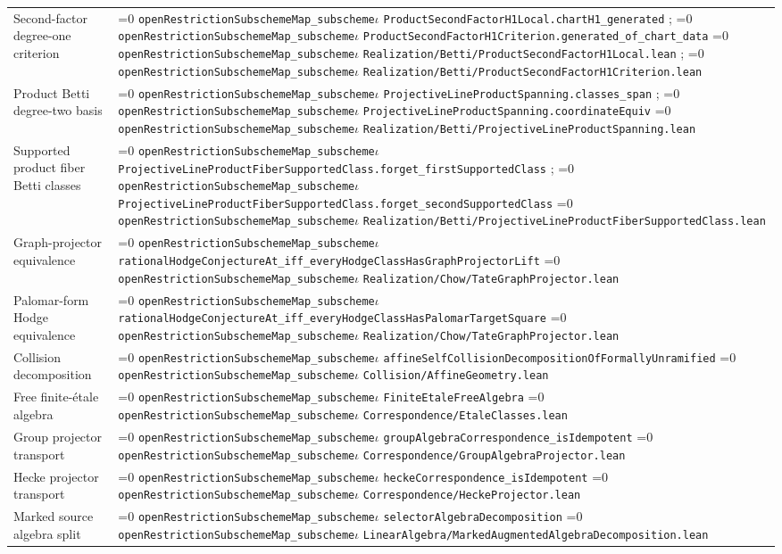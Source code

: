 \documentclass[11pt]{article}
\theoremstyle{definition}
\theoremstyle{remark}
\newcommand{\leanpath}[1]{%
  \ifnum\pdfstrcmp{\detokenize{#1}}%
      {\detokenize{openRestrictionSubschemeMap_subschemeι}}=0
    \texttt{\nolinkurl{openRestrictionSubschemeMap_subscheme}}\ensuremath{\iota}%
  \else
    \texttt{\nolinkurl{#1}}%
  \fi}
\begin{document}
\begin{longtable}{@{}>{\raggedright\arraybackslash}p{}
                >{\raggedright\arraybackslash}p{}@{}}
Second-factor degree-one criterion &
\leanpath{ProductSecondFactorH1Local.chartH1_generated};
\leanpath{ProductSecondFactorH1Criterion.generated_of_chart_data}\newline
\leanpath{Realization/Betti/ProductSecondFactorH1Local.lean};
\leanpath{Realization/Betti/ProductSecondFactorH1Criterion.lean}\\
Product Betti degree-two basis &
\leanpath{ProjectiveLineProductSpanning.classes_span};
\leanpath{ProjectiveLineProductSpanning.coordinateEquiv}\newline
\leanpath{Realization/Betti/ProjectiveLineProductSpanning.lean}\\
Supported product fiber Betti classes &
\leanpath{ProjectiveLineProductFiberSupportedClass.forget_firstSupportedClass};
\leanpath{ProjectiveLineProductFiberSupportedClass.forget_secondSupportedClass}\newline
\leanpath{Realization/Betti/ProjectiveLineProductFiberSupportedClass.lean}\\
Graph-projector equivalence &
\leanpath{rationalHodgeConjectureAt_iff_everyHodgeClassHasGraphProjectorLift}\newline
\leanpath{Realization/Chow/TateGraphProjector.lean}\\
Palomar-form Hodge equivalence &
\leanpath{rationalHodgeConjectureAt_iff_everyHodgeClassHasPalomarTargetSquare}\newline
\leanpath{Realization/Chow/TateGraphProjector.lean}\\
Collision decomposition &
\leanpath{affineSelfCollisionDecompositionOfFormallyUnramified}\newline
\leanpath{Collision/AffineGeometry.lean}\\
Free finite-\'etale algebra &
\leanpath{FiniteEtaleFreeAlgebra}\newline
\leanpath{Correspondence/EtaleClasses.lean}\\
Group projector transport &
\leanpath{groupAlgebraCorrespondence_isIdempotent}\newline
\leanpath{Correspondence/GroupAlgebraProjector.lean}\\
Hecke projector transport &
\leanpath{heckeCorrespondence_isIdempotent}\newline
\leanpath{Correspondence/HeckeProjector.lean}\\
Marked source algebra split &
\leanpath{selectorAlgebraDecomposition}\newline
\leanpath{LinearAlgebra/MarkedAugmentedAlgebraDecomposition.lean}\\

\end{longtable}
\end{document}
